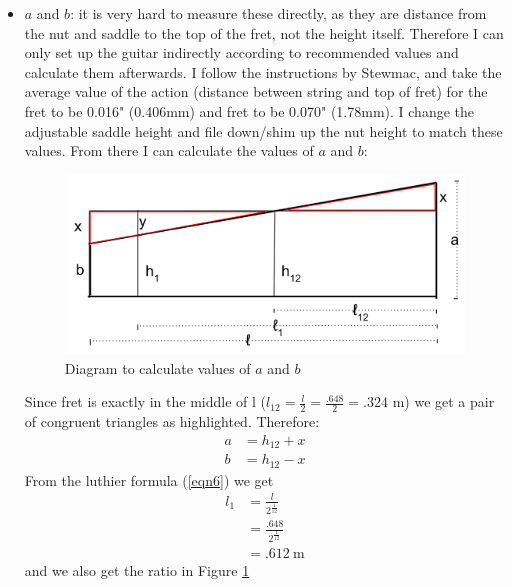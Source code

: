 \documentclass[11pt]{article}
\begin{document}
\begin{flushleft}
\begin{itemize}
                \item $a$ and $b$: it is very hard to measure these directly, as they are distance from the nut and saddle to the top of the fret, not the height itself. Therefore I can only set up the guitar indirectly according to recommended values and calculate them afterwards. I follow the instructions by Stewmac, and take the average value of the action (distance between string and top of fret) for the  fret to be 0.016" (0.406mm) and  fret to be 0.070" (1.78mm). I change the adjustable saddle height and file down/shim up the nut height to match these values. From there I can calculate the values of $a$ and $b$: \\
                \begin{figure}[ht]
                    \includegraphics[width = \textwidth]{fig4.png}
                    \caption{Diagram to calculate values of $a$ and $b$} \label{fig4}
                \end{figure}
                Since fret  is exactly in the middle of l ($l_{12} = \frac{l}{2} = \frac{.648}{2} = .324$ m) we get a pair of congruent triangles as highlighted. Therefore:
                \begin{align*}
                    a &= h_{12} + x \\
                    b &= h_{12} - x
                \end{align*}
                From the luthier formula (\ref{eqn6}) we get
                \begin{align*}
                    l_1 &= \frac{l}{2^{\frac{1}{12}}} \\
                        &= \frac{.648}{2^{\frac{1}{12}}} \\
                        &= \SI{.612}{\meter}
                \end{align*}
                and we also get the ratio in Figure \ref{fig4}
                \begin{align*}

\end{align*}
\end{itemize}
\end{flushleft}
\end{document}
